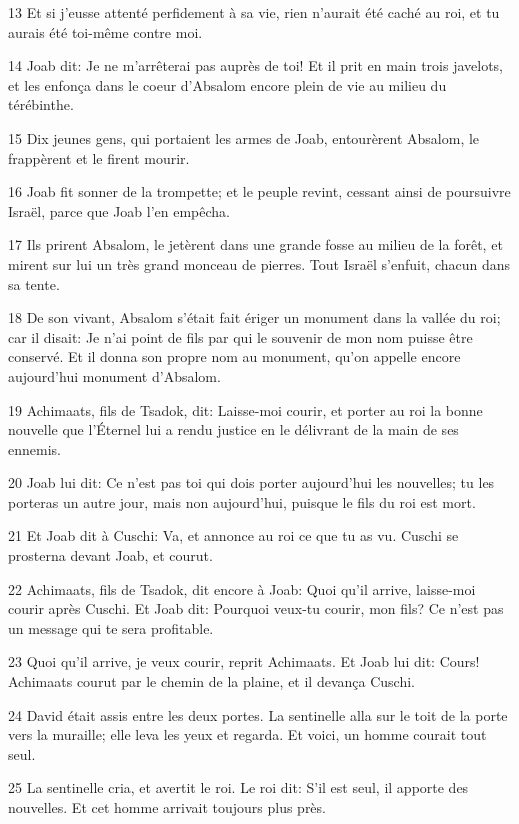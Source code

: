 \par 13 Et si j'eusse attenté perfidement à sa vie, rien n'aurait été caché au roi, et tu aurais été toi-même contre moi.
\par 14 Joab dit: Je ne m'arrêterai pas auprès de toi! Et il prit en main trois javelots, et les enfonça dans le coeur d'Absalom encore plein de vie au milieu du térébinthe.
\par 15 Dix jeunes gens, qui portaient les armes de Joab, entourèrent Absalom, le frappèrent et le firent mourir.
\par 16 Joab fit sonner de la trompette; et le peuple revint, cessant ainsi de poursuivre Israël, parce que Joab l'en empêcha.
\par 17 Ils prirent Absalom, le jetèrent dans une grande fosse au milieu de la forêt, et mirent sur lui un très grand monceau de pierres. Tout Israël s'enfuit, chacun dans sa tente.
\par 18 De son vivant, Absalom s'était fait ériger un monument dans la vallée du roi; car il disait: Je n'ai point de fils par qui le souvenir de mon nom puisse être conservé. Et il donna son propre nom au monument, qu'on appelle encore aujourd'hui monument d'Absalom.
\par 19 Achimaats, fils de Tsadok, dit: Laisse-moi courir, et porter au roi la bonne nouvelle que l'Éternel lui a rendu justice en le délivrant de la main de ses ennemis.
\par 20 Joab lui dit: Ce n'est pas toi qui dois porter aujourd'hui les nouvelles; tu les porteras un autre jour, mais non aujourd'hui, puisque le fils du roi est mort.
\par 21 Et Joab dit à Cuschi: Va, et annonce au roi ce que tu as vu. Cuschi se prosterna devant Joab, et courut.
\par 22 Achimaats, fils de Tsadok, dit encore à Joab: Quoi qu'il arrive, laisse-moi courir après Cuschi. Et Joab dit: Pourquoi veux-tu courir, mon fils? Ce n'est pas un message qui te sera profitable.
\par 23 Quoi qu'il arrive, je veux courir, reprit Achimaats. Et Joab lui dit: Cours! Achimaats courut par le chemin de la plaine, et il devança Cuschi.
\par 24 David était assis entre les deux portes. La sentinelle alla sur le toit de la porte vers la muraille; elle leva les yeux et regarda. Et voici, un homme courait tout seul.
\par 25 La sentinelle cria, et avertit le roi. Le roi dit: S'il est seul, il apporte des nouvelles. Et cet homme arrivait toujours plus près.
